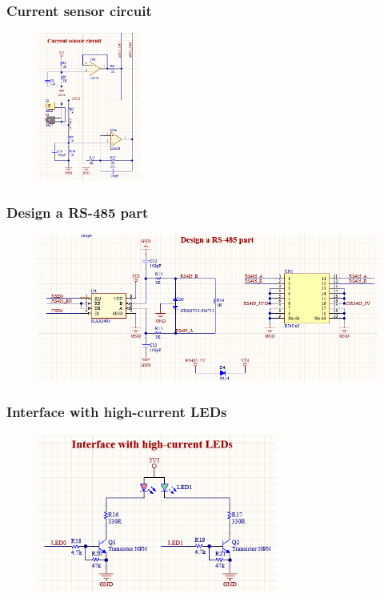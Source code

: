 \subsubsection{Current sensor circuit}
\label{subsec:Current sensor circuit}
\begin{figure}[!htbp]
    \centering
    \includegraphics[width=0.3\textwidth]{graphics/section3/f4.PNG}
\end{figure}
\FloatBarrier

\subsubsection{Design a RS-485 part}
\label{subsec: Design a RS-485 part}
\begin{figure}[!htbp]
    \centering
    \includegraphics[width=\textwidth]{graphics/section3/f5.PNG}
\end{figure}
\FloatBarrier

\subsubsection{Interface with high-current LEDs}
\label{subsec: Interface with high-current LEDs}
\begin{figure}[!htbp]
    \centering
    \includegraphics[width=0.7\textwidth]{graphics/section3/f6.PNG}
\end{figure}
\FloatBarrier


